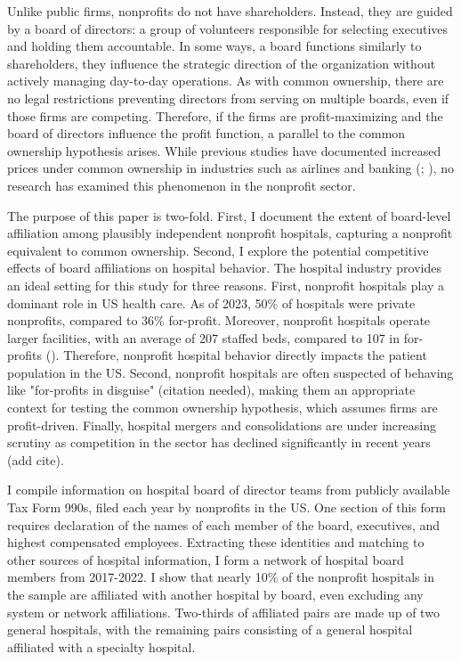\documentclass[12pt]{article}
\begin{document}
    Unlike public firms, nonprofits do not have shareholders. Instead, they are guided by a board of directors: a group of volunteers responsible for selecting executives and holding them accountable. In some ways, a board functions similarly to shareholders, they influence the strategic direction of the organization without actively managing day-to-day operations. As with common ownership, there are no legal restrictions preventing directors from serving on multiple boards, even if those firms are competing. Therefore, if the firms are profit-maximizing and the board of directors influence the profit function, a parallel to the common ownership hypothesis arises. While previous studies have documented increased prices under common ownership in industries such as airlines and banking (\cite{azar2018anticompetitive}; \cite{azar2022ultimate}), no research has examined this phenomenon in the nonprofit sector. 
    
    The purpose of this paper is two-fold. First, I document the extent of board-level affiliation among plausibly independent nonprofit hospitals, capturing a nonprofit equivalent to common ownership. Second, I explore the potential competitive effects of board affiliations on hospital behavior. The hospital industry provides an ideal setting for this study for three reasons. First, nonprofit hospitals play a dominant role in US health care. As of 2023, 50\% of hospitals were private nonprofits, compared to 36\% for-profit. Moreover, nonprofit hospitals operate larger facilities, with an average of 207 staffed beds, compared to 107 in for-profits (\cite{ASPE_2023}). Therefore, nonprofit hospital behavior directly impacts the patient population in the US. Second, nonprofit hospitals are often suspected of behaving like "for-profits in disguise" (citation needed), making them an appropriate context for testing the common ownership hypothesis, which assumes firms are profit-driven. Finally, hospital mergers and consolidations are under increasing scrutiny as competition in the sector has declined significantly in recent years (add cite). 

    I compile information on hospital board of director teams from publicly available Tax Form 990s, filed each year by nonprofits in the US. One section of this form requires declaration of the names of each member of the board, executives, and highest compensated employees. Extracting these identities and matching to other sources of hospital information, I form a network of hospital board members from 2017-2022. I show that nearly 10\% of the nonprofit hospitals in the sample are affiliated with another hospital by board, even excluding any system or network affiliations. Two-thirds of affiliated pairs are made up of two general hospitals, with the remaining pairs consisting of a general hospital affiliated with a specialty hospital. 
\end{document}
